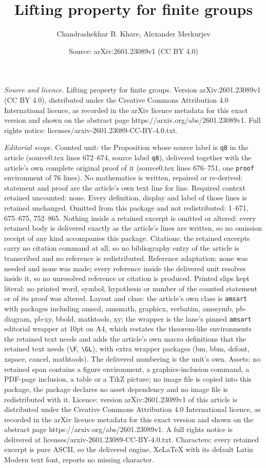 \documentclass[10pt,a4paper]{amsart}
\title[Lifting property for finite groups]{Lifting property for finite groups}
\author{Chandrashekhar B. Khare, Alexander Merkurjev}
\date{Source: arXiv:2601.23089v1 (CC BY 4.0)}
\begin{document}
\maketitle

\noindent\emph{Source and licence.} Lifting property for finite groups. Version arXiv:2601.23089v1 (CC BY 4.0), distributed under the Creative Commons Attribution 4.0 International licence, as recorded in the arXiv licence metadata for this exact version and shown on the abstract page https://arxiv.org/abs/2601.23089v1. Full rights notice: licenses/arxiv-2601.23089-CC-BY-4.0.txt.\par\smallskip

\noindent\textit{Editorial scope.} Counted unit: the Proposition whose source label is \texttt{q8} in the article (source0.tex lines 672--674, source label \texttt{q8}), delivered together with the article's own complete original proof of it (source0.tex lines 676--751, one \texttt{proof} environment of 76 lines). No mathematics is written, repaired or re-derived: statement and proof are the article's own text line for line. Required context retained uncounted: none. Every definition, display and label of those lines is retained unchanged. Omitted from this package and not redistributed: 1--671, 675--675, 752--865. Nothing inside a retained excerpt is omitted or altered: every retained body is delivered exactly as the article's lines are written, so no omission receipt of any kind accompanies this package. Citations: the retained excerpts carry no citation command at all, so no bibliography entry of the article is transcribed and no reference is redistributed. Reference adaptation: none was needed and none was made; every reference inside the delivered unit resolves inside it, so no unresolved reference or citation is produced. Printed slips kept literal: no printed word, symbol, hypothesis or number of the counted statement or of its proof was altered. Layout and class: the article's own class is \texttt{amsart} with packages including amscd, amsmath, graphicx, verbatim, amssymb, pb-diagram, pb-xy, bbold, mathtools, xy; the wrapper is the lane's pinned \texttt{amsart} editorial wrapper at 10pt on A4, which restates the theorem-like environments the retained text needs and adds the article's own macro definitions that the retained text needs (\texttt{\textbackslash F}, \texttt{\textbackslash GL}), with extra wrapper packages (bm, bbm, dsfont, xspace, cancel, mathtools). The delivered numbering is the unit's own. Assets: no retained span contains a figure environment, a graphics-inclusion command, a PDF-page inclusion, a table or a TikZ picture; no image file is copied into this package, the package declares no asset dependency and no image file is redistributed with it. Licence: version arXiv:2601.23089v1 of this article is distributed under the Creative Commons Attribution 4.0 International licence, as recorded in the arXiv licence metadata for this exact version and shown on the abstract page https://arxiv.org/abs/2601.23089v1. A full rights notice is delivered at licenses/arxiv-2601.23089-CC-BY-4.0.txt. Characters: every retained excerpt is pure ASCII, so the delivered engine, XeLaTeX with its default Latin Modern text font, reports no missing character.
\end{document}
